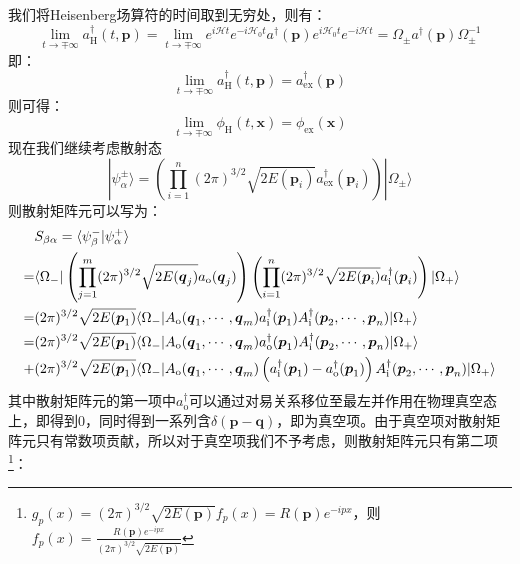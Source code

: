 我们将Heisenberg场算符的时间取到无穷处，则有：
\begin{equation}
\lim\limits_{t\rightarrow\mp\infty}a^\dagger_{\text{H}}(t,\boldsymbol{p})=\lim\limits_{t\rightarrow\mp\infty}e^{i\mathcal{H}t}e^{-i\mathcal{H}_0t}a^\dagger(\boldsymbol{p})e^{i\mathcal{H}_0t}e^{-i\mathcal{H}t}=\Omega_\pm a^\dagger(\boldsymbol{p})\Omega_\pm^{-1}
\end{equation}
即：
\begin{equation}
\lim\limits_{t\rightarrow\mp\infty}a^\dagger_{\text{H}}(t,\boldsymbol{p})=a^\dagger_{\text{ex}}(\boldsymbol{p})
\end{equation}
则可得：
\begin{equation}
\lim\limits_{t\rightarrow\mp\infty}\phi_{\text{H}}(t,\boldsymbol{x})=\phi_{\text{ex}}(\boldsymbol{x})
\end{equation}
现在我们继续考虑散射态
\begin{equation}
|\psi^{\pm}_\alpha\rangle=\left(\prod_{i=1}^{n}(2\pi)^{3/2}\sqrt{2E(\boldsymbol{p}_i)}a^\dagger_{\text{ex}}(\boldsymbol{p}_i)\right)|\Omega_\pm\rangle
\end{equation}
则散射矩阵元可以写为：
	\begin{align}
	&S_{\beta\alpha}=\langle\psi^-_\beta|\psi^+_\alpha\rangle\notag\\
	=&\langle\Omega_-|\left(\prod_{j=1}^{m}(2\pi)^{3/2}\sqrt{2E(\boldsymbol{q}_j)}a_{\text{o}}(\boldsymbol{q}_j)\right)\left(\prod_{i=1}^{n}(2\pi)^{3/2}\sqrt{2E(\boldsymbol{p}_i)}a^\dagger_{\text{i}}(\boldsymbol{p}_i)\right)|\Omega_+\rangle\notag\\
	=&(2\pi)^{3/2}\sqrt{2E(\boldsymbol{p}_1)}\langle\Omega_-|A_{\text{o}}(\boldsymbol{q}_1,\cdots,\boldsymbol{q}_m)a^\dagger_{\text{i}}(\boldsymbol{p}_1)A^\dagger_{\text{i}}(\boldsymbol{p}_2,\cdots,\boldsymbol{p}_n)|\Omega_+\rangle\notag\\
	=&(2\pi)^{3/2}\sqrt{2E(\boldsymbol{p}_1)}\langle\Omega_-|A_{\text{o}}(\boldsymbol{q}_1,\cdots,\boldsymbol{q}_m)a^\dagger_{\text{o}}(\boldsymbol{p}_1)A^\dagger_{\text{i}}(\boldsymbol{p}_2,\cdots,\boldsymbol{p}_n)|\Omega_+\rangle\notag\\
	+&(2\pi)^{3/2}\sqrt{2E(\boldsymbol{p}_1)}\langle\Omega_-|A_{\text{o}}(\boldsymbol{q}_1,\cdots,\boldsymbol{q}_m)\left(a^\dagger_{\text{i}}(\boldsymbol{p}_1)-a^\dagger_{\text{o}}(\boldsymbol{p}_1)\right)A^\dagger_{\text{i}}(\boldsymbol{p}_2,\cdots,\boldsymbol{p}_n)|\Omega_+\rangle
	\end{align}
其中散射矩阵元的第一项中$a^{\dagger}_{\text{o}}$可以通过对易关系移位至最左并作用在物理真空态上，即得到0，同时得到一系列含$\delta(\boldsymbol{p}-\boldsymbol{q})$，即为真空项。由于真空项对散射矩阵元只有常数项贡献，所以对于真空项我们不予考虑，则散射矩阵元只有第二项\footnote{$g_{{p}}(x)=(2\pi)^{3/2}\sqrt{2E(\boldsymbol{p})}f_p(x)=R(\boldsymbol{p})e^{-ipx}$，则$f_p(x)=\frac{R(\boldsymbol{p})e^{-ipx}}{(2\pi)^{3/2}\sqrt{2E(\boldsymbol{p})}}$}：
